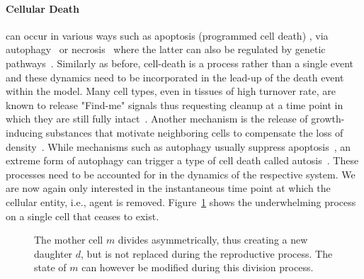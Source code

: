 \paragraph{Cellular Death} can occur in various ways such as apoptosis (programmed cell
death) \cite{Kerr1972,BOHM2003,Green2010,Raff1998}, via autophagy~\cite{Licheva2025,Galluzzi2017} or
necrosis~\cite{Gerschenson2001,Fink2005} where the latter can also be regulated by genetic
pathways~\cite{Berghe2014}.
Similarly as before, cell-death is a process rather than a single event and these dynamics need to
be incorporated in the lead-up of the death event within the model.
Many cell types, even in tissues of high turnover rate, are known to release "Find-me" signals thus
requesting cleanup at a time point in which they are still fully intact~\cite{Ravichandran2011}.
Another mechanism is the release of growth-inducing substances that motivate neighboring cells to
compensate the loss of density~\cite{Fan2008}.
While mechanisms such as autophagy usually suppress apoptosis~\cite{Marshall2018,Boya2005}, an
extreme form of autophagy can trigger a type of cell death called autosis~\cite{Liu2013}.
These processes need to be accounted for in the dynamics of the respective system.
We are now again only interested in the instantaneous time point at which the cellular entity, i.e.,
agent is removed.
Figure~\ref{fig:theory-cell-death} shows the underwhelming process on a single cell that ceases to
exist.

\begin{figure}[ht]
    \centering
    \caption[Cellular Death \& Removal]{
        The mother cell $m$ divides asymmetrically, thus creating a new daughter $d$, but is not
        replaced during the reproductive process.
        The state of $m$ can however be modified during this division process.
    }
    \label{fig:theory-cell-death}
\end{figure}

